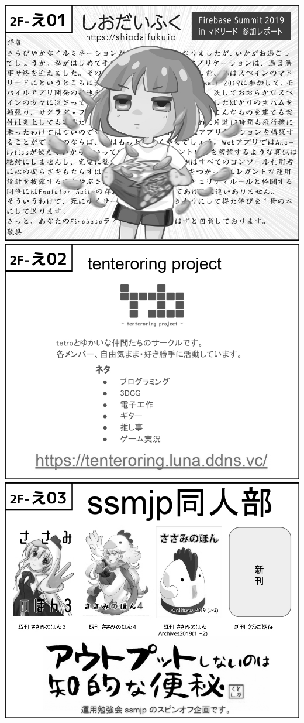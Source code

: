 \begin{center}
\includegraphics[width=0.9\linewidth]{images/circle-appeals/2F-え01.jpg}
\includegraphics[width=0.9\linewidth]{images/circle-appeals/2F-え02.jpg}
\includegraphics[width=0.9\linewidth]{images/circle-appeals/2F-え03.jpg}

\end{center}

